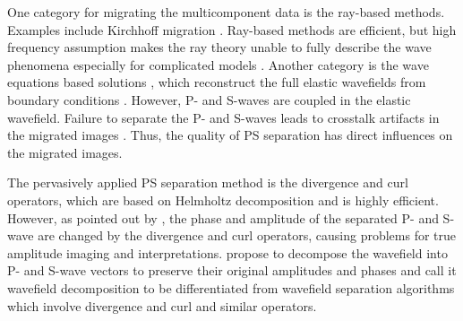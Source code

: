 \documentclass[manuscript,ulem,graphix,revised]{geophysics}
\begin{document}

One category for migrating the multicomponent data is the ray-based methods. Examples include Kirchhoff migration \citep{kuo84, dai86, hokstad00}.
Ray-based methods are efficient, but high frequency assumption makes the ray theory unable to fully describe the wave phenomena especially for complicated models \citep{gray01}.
Another category is the wave equations based solutions \citep{chang86,chang94,whitmore95}, which reconstruct the full elastic wavefields from boundary conditions \citep{wapenaar90}. 
However, P- and S-waves are coupled in the elastic wavefield. Failure to separate the P- and S-waves leads to crosstalk artifacts in the migrated images \citep{yan08}. Thus, the quality of PS separation has direct influences on the migrated images. 

The pervasively applied PS separation method is the divergence and curl operators, which are based on Helmholtz decomposition \citep{aki80} and is highly efficient. However, as pointed out by \citet{sun01}, the phase and amplitude of the separated P- and S-wave are changed by the divergence and curl operators, causing problems for true amplitude imaging and interpretations.
\citet{zhang10} propose to decompose the wavefield into P- and S-wave vectors to preserve their original amplitudes and phases and call it wavefield decomposition to be differentiated from wavefield separation algorithms which involve divergence and curl and similar operators. 
\end{document}
